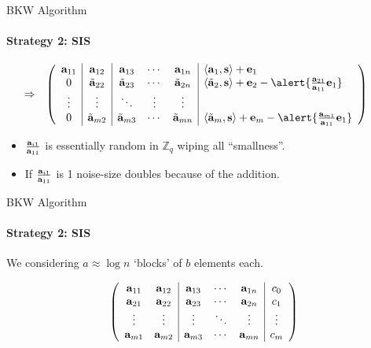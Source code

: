 \documentclass[10pt,compress]{beamer}
\renewcommand{\vec}[1]{\mathbf{#1}\xspace}
\newcommand{\dotp}[2]{\ensuremath{\left\langle {#1},{#2}\right\rangle}\xspace}
\newcommand{\shortvec}[1]{\tilde{\mathbf{#1}}\xspace}
\renewcommand{\vec}[1]{\mathbf{#1}\xspace}
\newcommand{\Z}{\ensuremath{\mathbb{Z}}\xspace}
\begin{document}
\begin{frame}[fragile]{BKW Algorithm}
  \framesubtitle{Strategy 2: SIS}
  \begin{eqnarray*}
    & \Rightarrow  & \left(
                     \begin{array}{c|c|ccc|l}
                       \bold{a}_{11} & \bold{a}_{12} & \bold{a}_{13} & \cdots & \bold{a}_{1n} & \dotp{\vec{a}_1}{\vec{s}} + \vec{e}_1\\
                       0 & \tilde{\bold{a}}_{22} & \tilde{\bold{a}}_{23} & \cdots & \tilde{\bold{a}}_{2n} & \dotp{\shortvec{a}_2}{\vec{s}} + \vec{e}_2 - \alert{\frac{\bold{a}_{21}}{\bold{a}_{11}}\vec{e}_1}\\
                       \vdots & \vdots & \ddots & \vdots & \vdots\\
                       0 & \tilde{\bold{a}}_{m2} & \tilde{\bold{a}}_{m3} & \cdots & \tilde{\bold{a}}_{mn} & \dotp{\shortvec{a}_m}{\vec{s}} + \vec{e}_m - \alert{\frac{\bold{a}_{m1}}{\bold{a}_{11}}\vec{e}_1}
                     \end{array}\right)\phantom{\Longrightarrow}
  \end{eqnarray*}

  \begin{itemize}
  \item $\frac{\bold{a}_{i1}}{\bold{a}_{11}}$ is essentially random in $\Z_q$ wiping all ``smallness''.
  \item If $\frac{\bold{a}_{i1}}{\bold{a}_{11}}$ is 1 noise-size doubles because of the addition.  
  \end{itemize}
\end{frame}

\begin{frame}[fragile]{BKW Algorithm}
  \framesubtitle{Strategy 2: SIS}
  We considering $a \approx \log n$ `blocks' of $b$ elements each.

  \begin{equation*}
    \left(
      \begin{array}{cc|ccc|c}
        \bold{a}_{11} & \bold{a}_{12} & \bold{a}_{13} & \cdots & \bold{a}_{1n} & c_0\\
        \bold{a}_{21} & \bold{a}_{22} & \bold{a}_{23} & \cdots & \bold{a}_{2n} & c_1\\
        \vdots & \vdots & \vdots & \ddots & \vdots & \vdots\\
        \bold{a}_{m1} & \bold{a}_{m2} & \bold{a}_{m3} & \cdots & \bold{a}_{mn} & c_{m}
      \end{array}
    \right)
  \end{equation*}
\end{frame}
\end{document}
